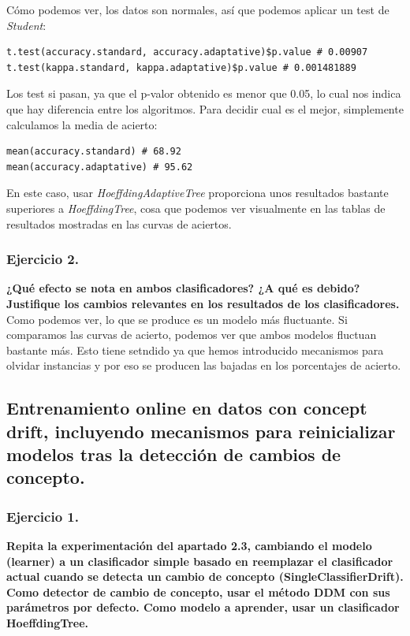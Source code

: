 \documentclass[11pt]{article}
\begin{document}
Cómo podemos ver, los datos son normales, así que podemos aplicar un test de \textit{Student}:

\begin{lstlisting}
t.test(accuracy.standard, accuracy.adaptative)$p.value # 0.00907
t.test(kappa.standard, kappa.adaptative)$p.value # 0.001481889
\end{lstlisting}

Los test si pasan, ya que el p-valor obtenido es menor que 0.05, lo cual nos indica que hay diferencia entre los algoritmos. Para decidir cual es el mejor, simplemente calculamos la media de acierto:

\begin{lstlisting}
mean(accuracy.standard) # 68.92
mean(accuracy.adaptative) # 95.62
\end{lstlisting}

En este caso, usar \textit{HoeffdingAdaptiveTree} proporciona unos resultados bastante superiores a \textit{HoeffdingTree}, cosa que podemos ver visualmente en las tablas de resultados mostradas en las curvas de aciertos.

\subsubsection{Ejercicio 2.}

\textbf{¿Qué efecto se nota en ambos clasificadores? ¿A qué es debido? Justifique los cambios relevantes en los resultados de los clasificadores.} \\

Como podemos ver, lo que se produce es un modelo más fluctuante. Si comparamos las curvas de acierto, podemos ver que ambos modelos fluctuan bastante más. Esto tiene setndido ya que hemos introducido mecanismos para olvidar instancias y por eso se producen las bajadas en los porcentajes de acierto.

\subsection{Entrenamiento online en datos con concept drift, incluyendo mecanismos para reinicializar modelos tras la detección de cambios de concepto.}

\subsubsection{Ejercicio 1.}

\textbf{Repita la experimentación del apartado 2.3, cambiando el modelo (learner) a un clasificador simple basado en reemplazar el clasificador actual cuando se detecta un cambio de concepto (SingleClassifierDrift). Como detector de cambio de concepto, usar el método DDM con sus parámetros por defecto. Como modelo a aprender, usar un clasificador HoeffdingTree.} \\
\end{document}
